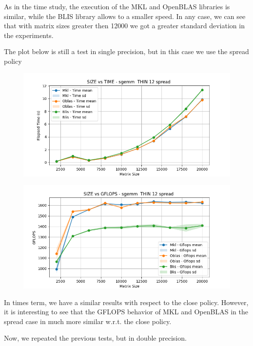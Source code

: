 \documentclass{article}
\begin{document}
As in the time study, the execution of the MKL and OpenBLAS libraries is similar, while the BLIS library allows to a smaller speed. In any case, we can see that with matrix sizes greater then 12000 we got a greater standard deviation in the experiments. 

 The plot below is still a test in single precision, but in this case we use the spread policy
\begin{figure}[H]
    \centering
    \includegraphics[width=\textwidth]{THIN 12/sgemm__THIN_12_spread_time.png}
\end{figure}

\begin{figure}[H]
    \centering
    \includegraphics[width=\textwidth]{THIN 12/sgemm__THIN_12_spread_gflops.png}
\end{figure}

In times term, we have a similar results with respect to the close policy. However, it is interesting to see that the GFLOPS behavior of MKL and OpenBLAS in the spread case in much more similar w.r.t. the close policy.

Now, we repeated the previous tests, but in double precision.
\end{document}
